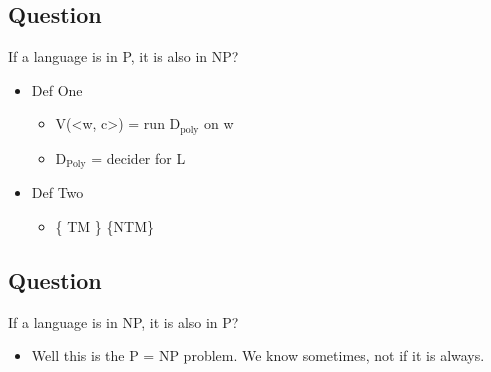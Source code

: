 \documentclass[11pt]{article}
\begin{document}
\subsection{Question}
\label{sec:org8573f9c}
If a language is in P, it is also in NP?
\begin{itemize}
\item Def One
\begin{itemize}
\item V(<w, c>) = run D\(_{\text{poly}}\) on w
\item D\(_{\text{Poly}}\) = decider for L
\end{itemize}
\item Def Two
\begin{itemize}
\item \{ TM \} \subseteq \{NTM\}
\end{itemize}
\end{itemize}
\subsection{Question}
\label{sec:org0b937cf}
If a language is in NP, it is also in P?
\begin{itemize}
\item Well this is the P = NP problem. We know sometimes, not if it is always.
\end{itemize}
\end{document}
